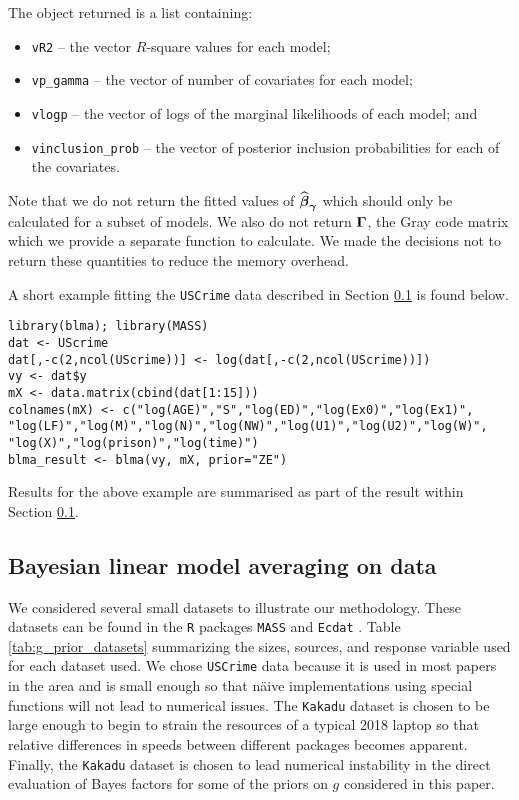 \noindent 
The object returned is a 
list containing:
\begin{itemize}
	\item 
	{\tt vR2} -- the vector $R$-square values for each model; 
	
	\item 
	{\tt vp\_gamma} -- the vector of number of covariates for each model;
	
	\item 
	{\tt vlogp} -- the vector of logs of the marginal likelihoods of each model; and
	
	\item 
	{\tt vinclusion\_prob} -- the vector of posterior inclusion probabilities for each of the covariates. 
\end{itemize}

\noindent 
Note that we do not return the fitted values of 
$\widehat{{\boldsymbol \beta}}_{{\boldsymbol \gamma}}$ which should only be calculated
for a subset of models. We also do not return ${\boldsymbol \Gamma}$, the Gray code matrix 
which we provide a separate function to calculate. We made the decisions
not to return these quantities to reduce the memory overhead.

A short example fitting the {\tt USCrime} data described in Section 
\ref{sec:BLMA} is found below.

\begin{verbatim}
library(blma); library(MASS)
dat <- UScrime
dat[,-c(2,ncol(UScrime))] <- log(dat[,-c(2,ncol(UScrime))])
vy <- dat$y
mX <- data.matrix(cbind(dat[1:15]))
colnames(mX) <- c("log(AGE)","S","log(ED)","log(Ex0)","log(Ex1)",
"log(LF)","log(M)","log(N)","log(NW)","log(U1)","log(U2)","log(W)",
"log(X)","log(prison)","log(time)") 
blma_result <- blma(vy, mX, prior="ZE")
\end{verbatim}

\noindent Results for the above example are summarised as part of the result within Section 
\ref{sec:BLMA}.

\subsection{Bayesian linear model averaging on data}\label{sec:BLMA}

We considered several small datasets to illustrate our methodology. These datasets
can be found in the {\tt R} packages {\tt MASS} \citep{Venables2002} and 
{\tt Ecdat} \citep{Croissant2016}. Table \ref{tab:g_prior_datasets} summarizing the sizes,  
sources, and response variable used for each dataset used. 
We chose {\tt USCrime} data because it is used in most papers in
the area and is small enough so that n\"aive implementations using special functions will
not lead to numerical issues. The 
{\tt Kakadu} dataset is chosen to
be large enough to begin to strain the resources of a typical 2018 laptop so that
relative differences in speeds between different packages becomes apparent. Finally, the
{\tt Kakadu} dataset is chosen to lead numerical instability in the direct evaluation of Bayes
factors for some of the priors on $g$ considered in this paper.

